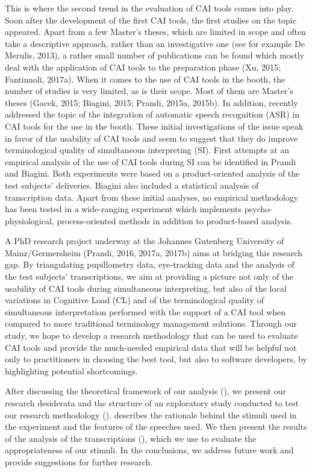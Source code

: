 \documentclass[output=paper]{langsci/langscibook}
\begin{document}
This is where the second trend in the evaluation of CAI tools comes into play. Soon after the development of the first CAI tools, the first studies on the topic appeared. Apart from a few Master’s theses, which are limited in scope and often take a descriptive approach, rather than an investigative one (see for example De Merulis, 2013), a rather small number of publications can be found which mostly deal with the application of CAI tools to the preparation phase (Xu, 2015; Fantinuoli, 2017a). When it comes to the use of CAI tools in the booth, the number of studies is very limited, as is their scope. Most of them are Master’s theses (Gacek, 2015; Biagini, 2015; Prandi, 2015a, 2015b). In addition, \citet{Fantinuoli2017b} recently addressed the topic of the integration of automatic speech recognition (ASR) in CAI tools for the use in the booth. These initial investigations of the issue speak in favor of the usability of CAI tools and seem to suggest that they do improve terminological quality of simultaneous interpreting (SI). First attempts at an empirical analysis of the use of CAI tools during SI can be identified in Prandi and Biagini. Both experiments were based on a product-oriented analysis of the test subjects’ deliveries. Biagini also included a statistical analysis of transcription data. Apart from these initial analyses, no empirical methodology has been tested in a wide-ranging experiment which implements psycho-physiological, process-oriented methods in addition to product-based analysis.

A PhD research project underway at the Johannes Gutenberg University of Mainz/Germersheim (Prandi, 2016, 2017a, 2017b) aims at bridging this research gap. By triangulating pupillometry data, eye-tracking data and the analysis of the test subjects’ transcriptions, we aim at providing a picture not only of the usability of CAI tools during simultaneous interpreting, but also of the local variations in Cognitive Load (CL) and of the terminological quality of simultaneous interpretation performed with the support of a CAI tool when compared to more traditional terminology management solutions. Through our study, we hope to develop a research methodology that can be used to evaluate CAI tools and provide the much-needed empirical data that will be helpful not only to practitioners in choosing the best tool, but also to software developers, by highlighting potential shortcomings.

After discussing the theoretical framework of our analysis (), we present our research desiderata and the structure of an exploratory study conducted to test our research methodology ().  describes the rationale behind the stimuli used in the experiment and the features of the speeches used. We then present the results of the analysis of the transcriptions (), which we use to evaluate the appropriateness of our stimuli. In the conclusions, we address future work and provide suggestions for further research.
\end{document}

